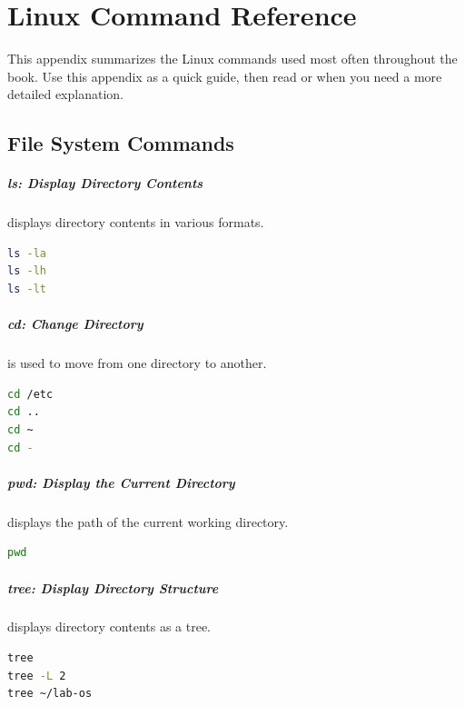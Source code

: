 
\chapter{Linux Command Reference}
\label{app:command-reference}

This appendix summarizes the Linux commands used most often throughout the book.
Use this appendix as a quick guide, then read 
or  when you need a more detailed explanation.

\section{File System Commands}

\paragraph*{ls: Display Directory Contents}
 displays directory contents in various formats.
\begin{lstlisting}[language=bash]
ls -la
ls -lh
ls -lt
\end{lstlisting}

\paragraph*{cd: Change Directory}
 is used to move from one directory to another.
\begin{lstlisting}[language=bash]
cd /etc
cd ..
cd ~
cd -
\end{lstlisting}

\paragraph*{pwd: Display the Current Directory}
 displays the path of the current working directory.
\begin{lstlisting}[language=bash]
pwd
\end{lstlisting}

\paragraph*{tree: Display Directory Structure}
 displays directory contents as a tree.
\begin{lstlisting}[language=bash]
tree
tree -L 2
tree ~/lab-os
\end{lstlisting}

